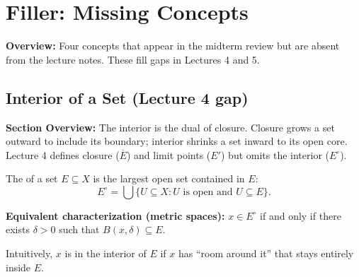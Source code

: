 \documentclass[../master/master.tex]{subfiles}
\begin{document}
\renewcommand{\lecturenum}{F}
\renewcommand{\lecturedate}{Spring 2026}
\renewcommand{\lecturetopic}{Filler: Missing Concepts from Lectures 1--6}

\section{Filler: Missing Concepts}

\begin{lecturesummary}
\textbf{Overview:} Four concepts that appear in the midterm review but are absent from the lecture notes. These fill gaps in Lectures 4 and 5.
\end{lecturesummary}

\subsection{Interior of a Set (Lecture 4 gap)}

\begin{summarybox}
\textbf{Section Overview:} The interior is the dual of closure. Closure grows a set outward to include its boundary; interior shrinks a set inward to its open core. Lecture 4 defines closure ($\overline{E}$) and limit points ($E'$) but omits the interior ($E^\circ$).
\end{summarybox}

\begin{definition}
The  of a set $E \subseteq X$ is the largest open set contained in $E$:
\[
    E^\circ = \bigcup \{ U \subseteq X : U \text{ is open and } U \subseteq E \}.
\]
\end{definition}

\textbf{Equivalent characterization (metric spaces):} $x \in E^\circ$ if and only if there exists $\delta > 0$ such that $B(x, \delta) \subseteq E$.

Intuitively, $x$ is in the interior of $E$ if $x$ has ``room around it'' that stays entirely inside $E$.
\end{document}
